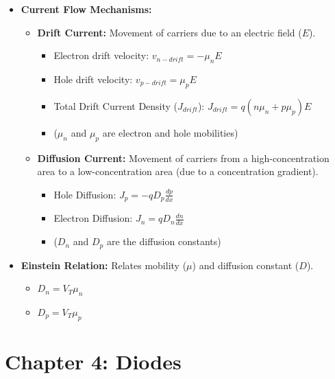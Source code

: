 \documentclass[12pt, letterpaper]{article}
\begin{document}
\begin{itemize}
    \item \textbf{Current Flow Mechanisms:}
    \begin{itemize}
        \item \textbf{Drift Current:} Movement of carriers due to an electric field ($E$).
        \begin{itemize}
            \item Electron drift velocity: $v_{n-drift} = -\mu_n E$
            \item Hole drift velocity: $v_{p-drift} = \mu_p E$
            \item Total Drift Current Density ($J_{drift}$): $J_{drift} = q(n\mu_n + p\mu_p)E$
            \item ($\mu_n$ and $\mu_p$ are electron and hole mobilities)
        \end{itemize}
        \item \textbf{Diffusion Current:} Movement of carriers from a high-concentration area to a low-concentration area (due to a concentration gradient).
        \begin{itemize}
            \item Hole Diffusion: $J_p = -qD_p \frac{dp}{dx}$
            \item Electron Diffusion: $J_n = qD_n \frac{dn}{dx}$
            \item ($D_n$ and $D_p$ are the diffusion constants)
        \end{itemize}
    \end{itemize}
    
    \item \textbf{Einstein Relation:} Relates mobility ($\mu$) and diffusion constant ($D$).
    \begin{itemize}
        \item $D_n = V_T \mu_n$
        \item $D_p = V_T \mu_p$
    \end{itemize}
\end{itemize}

\hrulefill

\section*{Chapter 4: Diodes}
\end{document}
